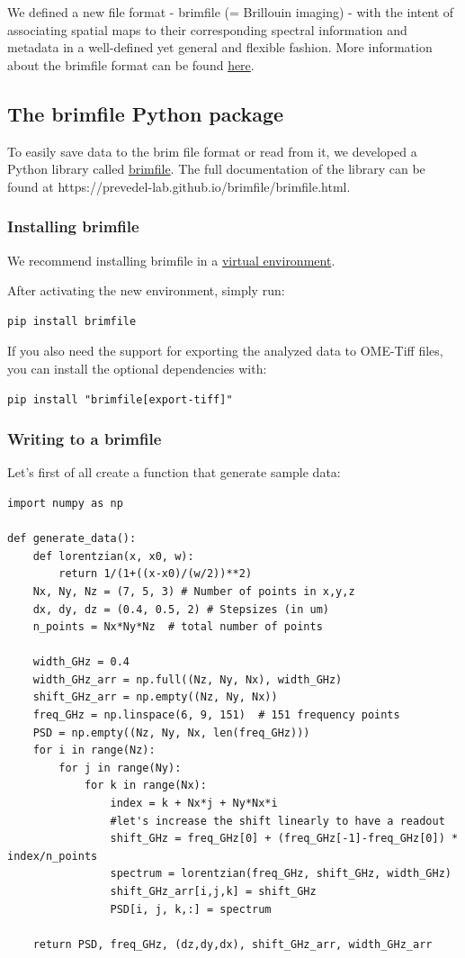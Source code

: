 \documentclass{article}
\begin{document}
We defined a new file format - brimfile (= Brillouin imaging) - with the intent of associating spatial maps to their corresponding spectral information and metadata in a well-defined yet general and flexible fashion. More information about the brimfile format can be found \href{https://github.com/prevedel-lab/Brillouin-standard-file}{here}.

\subsection{The brimfile Python package}

To easily save data to the brim file format or read from it, we developed a Python library called \href{https://pypi.org/project/brimfile/}{brimfile}. The full documentation of the library can be found at https://prevedel-lab.github.io/brimfile/brimfile.html.

\subsubsection{Installing brimfile}
We recommend installing brimfile in a \href{https://docs.python.org/3/library/venv.html}{virtual environment}.

After activating the new environment, simply run:
\begin{lstlisting}
pip install brimfile
\end{lstlisting}
If you also need the support for exporting the analyzed data to OME-Tiff files, you can install the optional dependencies with:
\begin{lstlisting}
pip install "brimfile[export-tiff]"
\end{lstlisting}

\subsubsection{Writing to a brimfile}

Let's first of all create a function that generate sample data:
\begin{lstlisting}
import numpy as np

def generate_data():
    def lorentzian(x, x0, w):
        return 1/(1+((x-x0)/(w/2))**2)
    Nx, Ny, Nz = (7, 5, 3) # Number of points in x,y,z
    dx, dy, dz = (0.4, 0.5, 2) # Stepsizes (in um)
    n_points = Nx*Ny*Nz  # total number of points

    width_GHz = 0.4
    width_GHz_arr = np.full((Nz, Ny, Nx), width_GHz)
    shift_GHz_arr = np.empty((Nz, Ny, Nx))
    freq_GHz = np.linspace(6, 9, 151)  # 151 frequency points
    PSD = np.empty((Nz, Ny, Nx, len(freq_GHz)))
    for i in range(Nz):
        for j in range(Ny):
            for k in range(Nx):
                index = k + Nx*j + Ny*Nx*i
                #let's increase the shift linearly to have a readout 
                shift_GHz = freq_GHz[0] + (freq_GHz[-1]-freq_GHz[0]) * index/n_points
                spectrum = lorentzian(freq_GHz, shift_GHz, width_GHz)
                shift_GHz_arr[i,j,k] = shift_GHz 
                PSD[i, j, k,:] = spectrum

    return PSD, freq_GHz, (dz,dy,dx), shift_GHz_arr, width_GHz_arr
\end{lstlisting}
\end{document}
